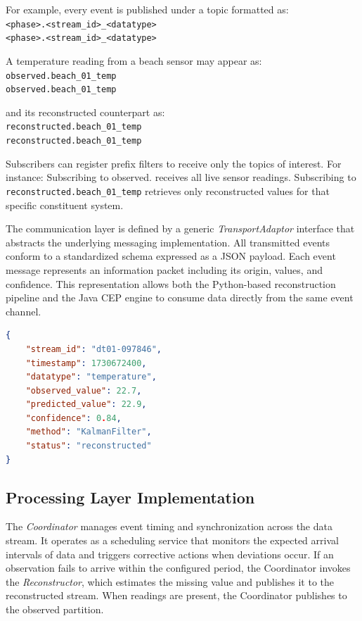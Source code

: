 For example, every event is published under a topic formatted as:
\\
\verb|<phase>.<stream_id>_<datatype>| \\
\verb|<phase>.<stream_id>_<datatype>|

A temperature reading from a beach sensor may appear as:
\\
\verb|observed.beach_01_temp| \\
\verb|observed.beach_01_temp| 

and its reconstructed counterpart as:
\\
\verb|reconstructed.beach_01_temp| \\
\verb|reconstructed.beach_01_temp| 

Subscribers can register prefix filters to receive only the topics of interest.
For instance:
Subscribing to observed. receives all live sensor readings.
Subscribing to \verb|reconstructed.beach_01_temp| retrieves only reconstructed values for that specific constituent system.


The communication layer is defined by a generic \textit{TransportAdaptor} interface that abstracts the underlying messaging implementation. All transmitted events conform to a standardized schema expressed as a JSON payload. Each event message represents an information packet including its origin, values, and confidence. This representation allows both the Python-based reconstruction pipeline and the Java CEP engine to consume data directly from the same event channel.

\begin{lstlisting}[language=json,caption={Event payload.},label={lst:eventstream-json},basicstyle=\ttfamily\small]
{
    "stream_id": "dt01-097846",
    "timestamp": 1730672400,
    "datatype": "temperature",
    "observed_value": 22.7,
    "predicted_value": 22.9,
    "confidence": 0.84,
    "method": "KalmanFilter",
    "status": "reconstructed"
}
\end{lstlisting}


\subsection{Processing Layer Implementation}
The \textit{Coordinator} manages event timing and synchronization across the data stream.  
It operates as a scheduling service that monitors the expected arrival intervals of data and triggers corrective actions when deviations occur.  
If an observation fails to arrive within the configured period, the Coordinator invokes the \textit{Reconstructor}, which estimates the missing value and publishes it to the reconstructed stream. When readings are present, the Coordinator publishes to the observed partition. 

